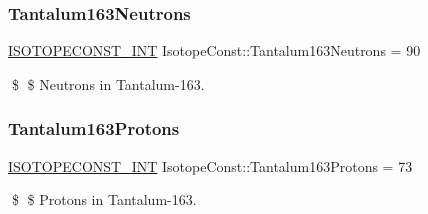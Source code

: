 \subsubsection{\texorpdfstring{Tantalum163\+Neutrons}{Tantalum163Neutrons}}
{\footnotesize\ttfamily \mbox{\hyperlink{group___isotope_const-_macros_ga5f18360b3e99483a35c32d789e62621c}{I\+S\+O\+T\+O\+P\+E\+C\+O\+N\+S\+T\+\_\+\+I\+NT}} Isotope\+Const\+::\+Tantalum163\+Neutrons = 90}

\$ \$ Neutrons in Tantalum-\/163. \mbox{\label{group___isotope_const-_tantalum-_ta163_ga91bba8586d06febc94733f54e1cdbd79}} 
\subsubsection{\texorpdfstring{Tantalum163\+Protons}{Tantalum163Protons}}
{\footnotesize\ttfamily \mbox{\hyperlink{group___isotope_const-_macros_ga5f18360b3e99483a35c32d789e62621c}{I\+S\+O\+T\+O\+P\+E\+C\+O\+N\+S\+T\+\_\+\+I\+NT}} Isotope\+Const\+::\+Tantalum163\+Protons = 73}

\$ \$ Protons in Tantalum-\/163. 